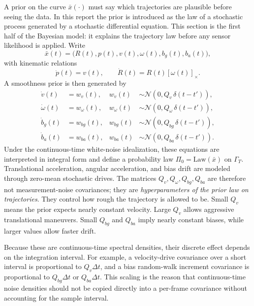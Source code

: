 \documentclass[11pt]{report}
\newcommand{\Gspace}{\Gamma_T}
\newcommand{\crossmat}[1]{\left[#1\right]_{\times}}
\begin{document}
A prior on the curve $\bar x(\cdot)$ must say which trajectories are plausible before seeing the data. In this report the prior is introduced as the law of a stochastic process generated by a stochastic differential equation. This section is the first half of the Bayesian model: it explains the trajectory law before any sensor likelihood is applied. Write
\begin{equation}
\bar x(t)=\big(R(t),p(t),v(t),\omega(t),b_g(t),b_a(t)\big),
\end{equation}
with kinematic relations
\begin{equation}
\dot p(t)=v(t),
\qquad
\dot R(t)=R(t)\crossmat{\omega(t)}.
\end{equation}
A smoothness prior is then generated by
\begin{align}
\dot v(t) &= w_v(t), & w_v(t) &\sim \mathcal N(0,Q_v\,\delta(t-t')),\\
\dot \omega(t) &= w_\omega(t), & w_\omega(t) &\sim \mathcal N(0,Q_\omega\,\delta(t-t')),\\
\dot b_g(t) &= w_{bg}(t), & w_{bg}(t) &\sim \mathcal N(0,Q_{bg}\,\delta(t-t')),\\
\dot b_a(t) &= w_{ba}(t), & w_{ba}(t) &\sim \mathcal N(0,Q_{ba}\,\delta(t-t')).
\label{eq:curve_prior_sde_new}
\end{align}
Under the continuous-time white-noise idealization, these equations are interpreted in integral form and define a probability law $\Pi_0=\mathrm{Law}(\bar x)$ on $\Gspace$. Translational acceleration, angular acceleration, and bias drift are modeled through zero-mean stochastic drives. The matrices $Q_v,Q_\omega,Q_{bg},Q_{ba}$ are therefore not measurement-noise covariances; they are \emph{hyperparameters of the prior law on trajectories}. They control how rough the trajectory is allowed to be. Small $Q_v$ means the prior expects nearly constant velocity. Large $Q_v$ allows aggressive translational maneuvers. Small $Q_{bg}$ and $Q_{ba}$ imply nearly constant biases, while larger values allow faster drift.

Because these are continuous-time spectral densities, their discrete effect depends on the integration interval. For example, a velocity-drive covariance over a short interval is proportional to $Q_v\Delta t$, and a bias random-walk increment covariance is proportional to $Q_{bg}\Delta t$ or $Q_{ba}\Delta t$. This scaling is the reason that continuous-time noise densities should not be copied directly into a per-frame covariance without accounting for the sample interval.
\end{document}
